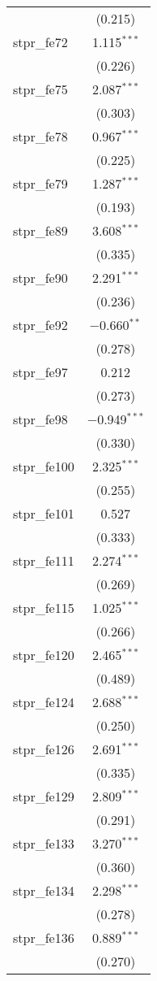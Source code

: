 \begin{table}[!htbp]
\begin{tabular}{@{\extracolsep{5pt}}lc}
  & (0.215) \\ 
  stpr\_fe72 & 1.115$^{***}$ \\ 
  & (0.226) \\ 
  stpr\_fe75 & 2.087$^{***}$ \\ 
  & (0.303) \\ 
  stpr\_fe78 & 0.967$^{***}$ \\ 
  & (0.225) \\ 
  stpr\_fe79 & 1.287$^{***}$ \\ 
  & (0.193) \\ 
  stpr\_fe89 & 3.608$^{***}$ \\ 
  & (0.335) \\ 
  stpr\_fe90 & 2.291$^{***}$ \\ 
  & (0.236) \\ 
  stpr\_fe92 & $-$0.660$^{**}$ \\ 
  & (0.278) \\ 
  stpr\_fe97 & 0.212 \\ 
  & (0.273) \\ 
  stpr\_fe98 & $-$0.949$^{***}$ \\ 
  & (0.330) \\ 
  stpr\_fe100 & 2.325$^{***}$ \\ 
  & (0.255) \\ 
  stpr\_fe101 & 0.527 \\ 
  & (0.333) \\ 
  stpr\_fe111 & 2.274$^{***}$ \\ 
  & (0.269) \\ 
  stpr\_fe115 & 1.025$^{***}$ \\ 
  & (0.266) \\ 
  stpr\_fe120 & 2.465$^{***}$ \\ 
  & (0.489) \\ 
  stpr\_fe124 & 2.688$^{***}$ \\ 
  & (0.250) \\ 
  stpr\_fe126 & 2.691$^{***}$ \\ 
  & (0.335) \\ 
  stpr\_fe129 & 2.809$^{***}$ \\ 
  & (0.291) \\ 
  stpr\_fe133 & 3.270$^{***}$ \\ 
  & (0.360) \\ 
  stpr\_fe134 & 2.298$^{***}$ \\ 
  & (0.278) \\ 
  stpr\_fe136 & 0.889$^{***}$ \\ 
  & (0.270) \\ 

\end{tabular}
\end{table}
